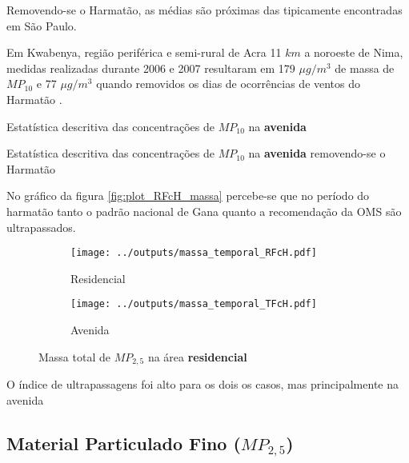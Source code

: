 Removendo-se o Harmatão, as médias são próximas das tipicamente
encontradas em São Paulo. 

Em Kwabenya, região periférica e semi-rural de Acra 11 $km$ a noroeste de Nima, 
medidas realizadas durante 2006 e 2007 resultaram em 179 $\mu g / m^3$ de massa 
de $MP_{10}$ e 77 $\mu g / m^3$ quando removidos os dias de ocorrências
de ventos do Harmatão \citep{aboh2009}.

\begin{table}[H]
  \centering
    
  \caption{Estatística descritiva das concentrações de $MP_{10}$ na 
           \textbf{avenida} \label{table:TIcH_descriptive}}
\end{table}

\begin{table}[H]
  \centering
    
  \caption{Estatística descritiva das concentrações de $MP_{10}$ na 
           \textbf{avenida} removendo-se o Harmatão
           \label{table:TIsH_descriptive}}
\end{table}

No gráfico da figura \ref{fig:plot_RFcH_massa} percebe-se que no período 
do harmatão tanto o padrão nacional de Gana quanto a recomendação da OMS 
são ultrapassados.

\begin{figure}[H]
  \centering
  \begin{subfigure}[b]{0.45\textwidth}
    \texttt{[image: ../outputs/massa\_temporal\_RFcH.pdf]}
    \caption{Residencial}
  \end{subfigure}%
  \begin{subfigure}[b]{0.45\textwidth}
    \texttt{[image: ../outputs/massa\_temporal\_TFcH.pdf]}
    \caption{Avenida}
  \end{subfigure}
  \caption{Massa total de $MP_{2,5}$ na área \textbf{residencial} \label{fig:massa_temporal_fino}}
\end{figure}

O índice de ultrapassagens foi alto para os dois os casos, 
mas principalmente na avenida

\subsection{Material Particulado Fino ($MP_{2,5}$)}

